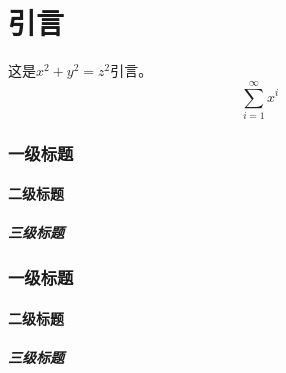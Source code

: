\part*{引言}
这是$ x^2+y^2=z^2 $引言。\[ \sum_{i=1}^{\infty}x^i \]
\section{一级标题}
\subsection{二级标题}
\subsubsection{三级标题}
\section{一级标题}
\subsection{二级标题}
\subsubsection{三级标题}